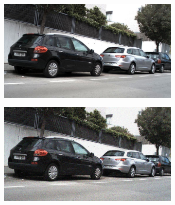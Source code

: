 \documentclass[a4paper]{ctexart}
\begin{document}
\begin{figure}[htbp]
\begin{subfigure}{0.08\textwidth}
			\label{fig：Gamma=0.5, Gauss Noise = 1.0}
		\end{subfigure} \\
		
		\vspace{-15pt}
		
		\begin{subfigure}{0.02\textwidth}
			\captionsetup{font=scriptsize}
			\caption*{}
			\vspace{-2pt}
		\end{subfigure}
		\begin{subfigure}{0.08\textwidth}
			\captionsetup{font=scriptsize}
			\includegraphics[width=\linewidth]{picture/Edge Detection/degrade/RGB_001 Gamma=0.6, Gauss Noise=0.0}
			\label{fig: Gamma=0.6, Gauss Noise = 0.0}
		\end{subfigure}
		\begin{subfigure}{0.08\textwidth}
			\captionsetup{font=scriptsize}
			\includegraphics[width=\linewidth]{picture/Edge Detection/degrade/RGB_001 Gamma=0.6, Gauss Noise=0.1}

\end{subfigure}
\end{figure}
\end{document}
